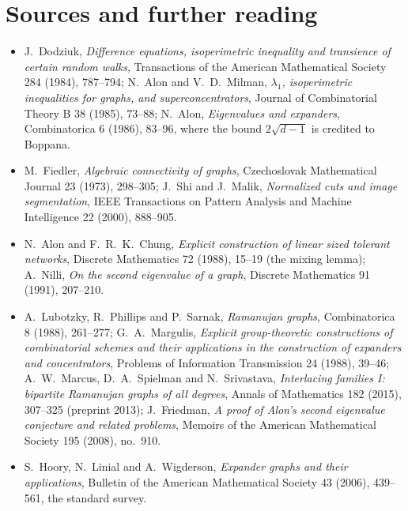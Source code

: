 \section*{Sources and further reading}

\begin{itemize}
\item J.~Dodziuk, \emph{Difference equations, isoperimetric inequality and transience of certain random walks}, Transactions of the American Mathematical Society 284 (1984),
787--794; N.~Alon and V.~D.~Milman, \emph{$\lambda_1$, isoperimetric inequalities for graphs, and superconcentrators}, Journal of Combinatorial Theory B 38 (1985), 73--88;
N.~Alon, \emph{Eigenvalues and expanders}, Combinatorica 6 (1986), 83--96, where the bound $2\sqrt{d-1}$ is credited to Boppana.
\item M.~Fiedler, \emph{Algebraic connectivity of graphs}, Czechoslovak Mathematical Journal 23 (1973), 298--305; J.~Shi and J.~Malik, \emph{Normalized cuts and image
segmentation}, IEEE Transactions on Pattern Analysis and Machine Intelligence 22 (2000), 888--905.
\item N.~Alon and F.~R.~K.~Chung, \emph{Explicit construction of linear sized tolerant networks}, Discrete Mathematics 72 (1988), 15--19 (the mixing lemma); A.~Nilli,
\emph{On the second eigenvalue of a graph}, Discrete Mathematics 91 (1991), 207--210.
\item A.~Lubotzky, R.~Phillips and P.~Sarnak, \emph{Ramanujan graphs}, Combinatorica 8 (1988), 261--277; G.~A.~Margulis, \emph{Explicit group-theoretic constructions of
combinatorial schemes and their applications in the construction of expanders and concentrators}, Problems of Information Transmission 24 (1988), 39--46;
A.~W.~Marcus, D.~A.~Spielman and N.~Srivastava, \emph{Interlacing families I: bipartite Ramanujan graphs of all degrees}, Annals of Mathematics 182 (2015), 307--325
(preprint 2013); J.~Friedman, \emph{A proof of Alon's second eigenvalue conjecture and related problems}, Memoirs of the American Mathematical Society 195 (2008), no.~910.
\item S.~Hoory, N.~Linial and A.~Wigderson, \emph{Expander graphs and their applications}, Bulletin of the American Mathematical Society 43 (2006), 439--561, the standard survey.
\end{itemize}
